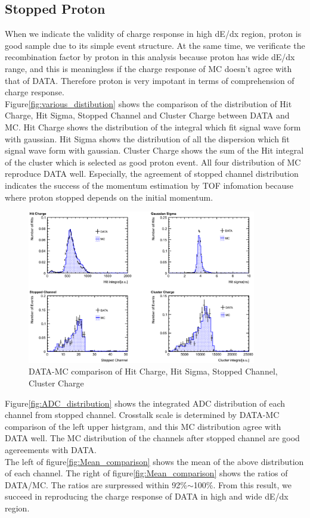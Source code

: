 \subsection{Stopped Proton}

When we indicate the validity of charge response in high dE/dx region, proton is good sample due to its simple event structure.
At the same time, we verificate the recombination factor by proton in this analysis because proton has wide dE/dx range, and this is meaningless if the charge response of MC doesn't agree with that of DATA.
Therefore proton is very impotant in terms of comprehension of charge response.\\
Figure\ref{fig:various_distibution} shows the comparison of the distribution of Hit Charge, Hit Sigma, Stopped Channel and  Cluster Charge between DATA and MC.
Hit Charge shows the distribution of the integral which fit signal wave form  with gaussian.
Hit Sigma shows the distribution of all the dispersion which fit signal wave form with gaussian.
Cluster Charge shows the sum of the Hit integral of the cluster which is selected as good proton event.
All four distribution of MC reproduce DATA well.
Especially, the agreement of stopped channel distribution indicates the success of the momentum estimation by TOF infomation because where proton stopped depends on the initial momentum.\\

\begin{figure}[htbp]
  \centering
  \includegraphics[width=10cm,clip]{./fig/stop_proton_1.eps}
  \caption{DATA-MC comparison of Hit Charge, Hit Sigma, Stopped Channel, Cluster Charge}
  \label{fig:varios_distribution}
\end{figure}

Figure\ref{fig:ADC_distribution} shows the integrated ADC distribution of each channel from stopped channel.
Crosstalk scale is determined by DATA-MC comparison of the left upper histgram,
and this MC distribution agree with DATA well.
The MC distribution of the channels after stopped channel are good agereements with DATA.\\
The left of figure\ref{fig:Mean_comparison} shows the mean of the above distribution of each channel.
The right of figure\ref{fig:Mean_comparison} shows the ratios of DATA/MC.
The ratios are surpressed within 92\%$\sim$100\%.
From this result, we succeed in reproducing the charge response of DATA in high and wide dE/dx region.


